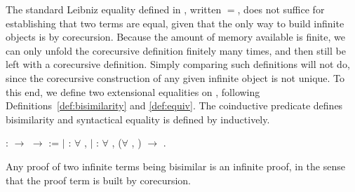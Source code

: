 The standard Leibniz equality defined in \Coq, written $=$, does not suffice
for establishing that two terms are equal, given that the only way to build
infinite objects is by corecursion. Because the amount of memory available is
finite, we can only unfold the corecursive definition finitely many times, and
then still be left with a corecursive definition. Simply comparing such
definitions will not do, since the corecursive construction of any given
infinite object is not unique. To this end, we define two extensional
equalities on , following
Definitions~\ref{def:bisimilarity} and \ref{def:equiv}. The coinductive
predicate  defines bisimilarity and
syntactical equality is defined by 
inductively.

\begin{singlespace}
\begin{coqdoccode}
\coqdocnoindent
{}
 :
 \ensuremath{\rightarrow}
 \ensuremath{\rightarrow}
 :=\coqdoceol
\coqdocindent{1.00em}
\ensuremath{|}
 :
\ensuremath{\forall} ,
 
 \coqdoceol
\coqdocindent{1.00em}
\ensuremath{|}
 :
\ensuremath{\forall}   ,
(\ensuremath{\forall} ,
 
 )
\ensuremath{\rightarrow}
 
 
.\coqdoceol
\end{coqdoccode}
\end{singlespace}
Any proof of two infinite terms being bisimilar is an infinite proof, in the
sense that the proof term is built by corecursion.

